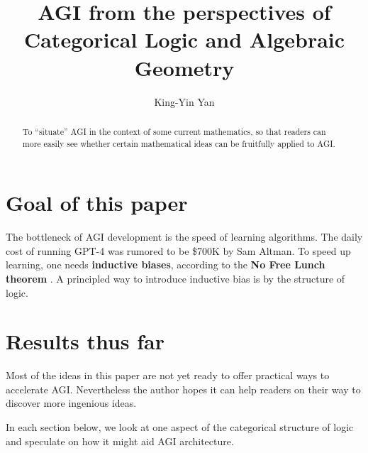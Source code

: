 \documentclass[runningheads]{llncs}
\begin{document}
%
\title{AGI from the perspectives of Categorical Logic and Algebraic Geometry}
%
%
\author{King-Yin Yan }
%
%
%
\maketitle              %
%
\begin{abstract}
To ``situate'' AGI in the context of some current mathematics, so that readers can more easily see whether certain mathematical ideas can be fruitfully applied to AGI.

\end{abstract}
%
%
%
\section{Goal of this paper}

The bottleneck of AGI development is the speed of learning algorithms.  The daily cost of running GPT-4 was rumored to be \$700K by Sam Altman.  To speed up learning, one needs \textbf{inductive biases}, according to the \textbf{No Free Lunch theorem} \cite{Wolpert1997} \cite{Wikipedia-no-free-lunch}.  A principled way to introduce inductive bias is by the structure of logic. 

\section{Results thus far}

Most of the ideas in this paper are not yet ready to offer practical ways to accelerate AGI.  Nevertheless the author hopes it can help readers on their way to discover more ingenious ideas.

In each section below, we look at one aspect of the categorical structure of logic and speculate on how it might aid AGI architecture.
\end{document}
